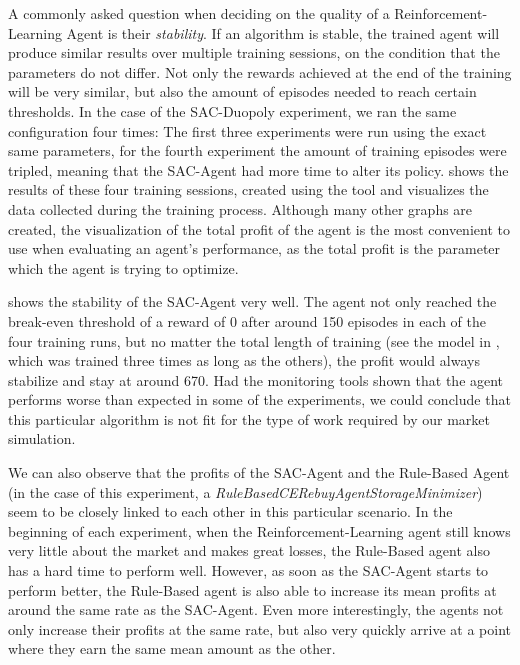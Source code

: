 A commonly asked question when deciding on the quality of a Reinforcement-Learning Agent is their \emph{stability}. If an algorithm is stable, the trained agent will produce similar results over multiple training sessions, on the condition that the parameters do not differ. Not only the rewards achieved at the end of the training will be very similar, but also the amount of episodes needed to reach certain thresholds. In the case of the SAC-Duopoly experiment, we ran the same configuration four times: The first three experiments were run using the exact same parameters, for the fourth experiment the amount of training episodes were tripled, meaning that the SAC-Agent had more time to alter its policy.  shows the results of these four training sessions, created using the  tool and visualizes the data collected during the training process. Although many other graphs are created, the visualization of the total profit of the agent is the most convenient to use when evaluating an agent's performance, as the total profit is the parameter which the agent is trying to optimize.

 shows the stability of the SAC-Agent very well. The agent not only reached the break-even threshold of a reward of 0 after around 150 episodes in each of the four training runs, but no matter the total length of training (see the model in , which was trained three times as long as the others), the profit would always stabilize and stay at around 670. Had the monitoring tools shown that the agent performs worse than expected in some of the experiments, we could conclude that this particular algorithm is not fit for the type of work required by our market simulation.

We can also observe that the profits of the SAC-Agent and the Rule-Based Agent (in the case of this experiment, a \emph{RuleBasedCERebuyAgentStorageMinimizer}) seem to be closely linked to each other in this particular scenario. In the beginning of each experiment, when the Reinforcement-Learning agent still knows very little about the market and makes great losses, the Rule-Based agent also has a hard time to perform well. However, as soon as the SAC-Agent starts to perform better, the Rule-Based agent is also able to increase its mean profits at around the same rate as the SAC-Agent. Even more interestingly, the agents not only increase their profits at the same rate, but also very quickly arrive at a point where they earn the same mean amount as the other.


